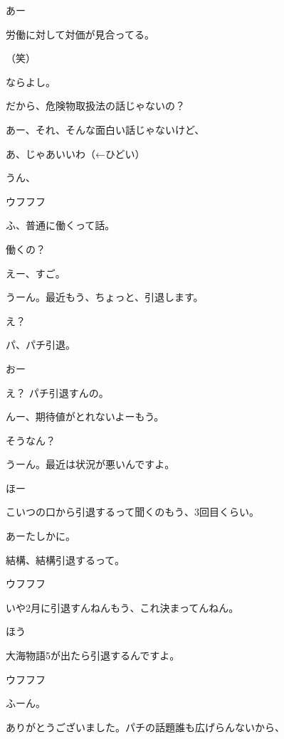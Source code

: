 \begin{multicols}{3}
{        あー

        労働に対して対価が見合ってる。

        （笑）

        ならよし。

        だから、危険物取扱法の話じゃないの？

        あー、それ、そんな面白い話じゃないけど、

        あ、じゃあいいわ（←ひどい）

        うん、

        ウフフフ

        ふ、普通に働くって話。

        働くの？

        えー、すご。

        うーん。最近もう、ちょっと、引退します。

        え？

        パ、パチ引退。

        おー

        え？ パチ引退すんの。

        んー、期待値がとれないよーもう。

        そうなん？

        うーん。最近は状況が悪いんですよ。

        ほー

        こいつの口から引退するって聞くのもう、3回目くらい。

        あーたしかに。

        結構、結構引退するって。

        ウフフフ

        いや2月に引退すんねんもう、これ決まってんねん。

        ほう

        大海物語5が出たら引退するんですよ。

        ウフフフ

        ふーん。

        ありがとうございました。パチの話題誰も広げらんないから、

}
\end{multicols}
